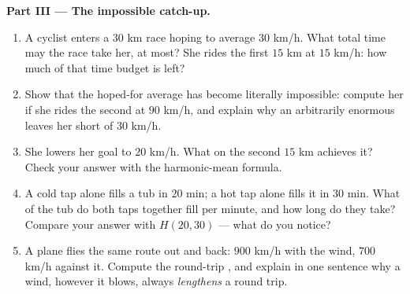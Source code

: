 \begin{problem}
\medskip
\noindent\textbf{Part III --- The impossible catch-up.}
\begin{enumerate}[resume]
  \item A cyclist enters a $30$ km race hoping to average
        $30$ km/h. What total time may the race take her, at
        most? She rides the first $15$ km at $15$ km/h: how much
        of that time budget is left?
  \item Show that the hoped-for average has become literally
        impossible: compute her  if she rides the
        second  at $90$ km/h, and explain why  an
        arbitrarily enormous  leaves her short of
        $30$ km/h.
  \item She lowers her goal to $20$ km/h. What  on the
        second $15$ km achieves it? Check your answer with the
        harmonic-mean formula.
  \item A cold tap alone fills a tub in $20$ min; a hot tap alone
        fills it in $30$ min. What  of the tub do both
        taps together fill per minute, and how long do they take?
        Compare your answer with $H(20, 30)$ --- what do you
        notice?
  \item A plane flies the same route out and back: $900$ km/h
        with the wind, $700$ km/h against it. Compute the
        round-trip , and explain in one sentence why
        a wind, however it blows, always \emph{lengthens} a round
        trip.
\end{enumerate}
\end{problem}
